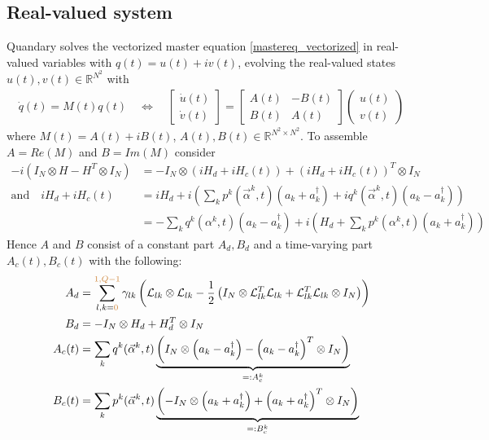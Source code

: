 \documentclass[letterpaper]{article}
\newcommand{\YC}[1]{{\textcolor{Bronze}{#1}}}
\newcommand{\Ell}{\mathcal{L}}
\newcommand{\R}{\mathds{R}}
\begin{document}
  \subsection{Real-valued system}
   Quandary solves the vectorized master equation \eqref{mastereq_vectorized} in
   real-valued variables with $q(t) = u(t) + iv(t)$, evolving the real-valued
   states $u(t), v(t)\in \R^{N^2}$ with
   \begin{align}
     \dot q(t) = M(t) q(t) \quad \Leftrightarrow \quad \begin{bmatrix} \dot u(t) \\ \dot v(t) \end{bmatrix} = 
   \begin{bmatrix} A(t) & -B(t) \\ B(t) & A(t) \end{bmatrix} 
   \begin{pmatrix} u(t) \\ v(t) \end{pmatrix} 
   \label{realvaluedODE}
   \end{align}
   where $M(t) = A(t) + i B(t)$, $A(t), B(t)\in \R^{N^2\times N^2}$. To assemble
   $A = Re(M)$ and $B = Im(M)$ consider
   \begin{align}
     -i(I_N \otimes H - H^T \otimes I_N) &= -I_N \otimes \left(iH_d +
     iH_c(t)\right) + \left(iH_d + iH_c(t)\right)^T \otimes I_N \\
     \text{and} \quad iH_d + iH_c(t) &= i H_d + i\left( \sum_k
     p^k(\vec{\alpha}^k,t)(a_k + a_k^{\dagger}) + iq^k(\vec{\alpha}^k,t)(a_k -
     a_k^{\dagger})\right) \\
                    &= - \sum_k q^k(\alpha^k,t)(a_k - a_k^{\dagger}) + i\left(
                    H_d + \sum_k p^k(\alpha^k,t)(a_k+a_k^{\dagger}) \right) 
   \end{align}
   Hence $A$ and $B$ consist of a constant part $A_d, B_d$ and a time-varying
   part $A_c(t), B_c(t)$ with the following:
   \begin{align}
     A_d &=  \sum_{l,k=\YC{0}}^{\YC{1,Q-1}}\gamma_{lk} \left( \Ell_{lk}\otimes\Ell_{lk} -
     \frac 1 2 \left(I_N \otimes \Ell_{lk}^T\Ell_{lk} +
     \Ell_{lk}^T\Ell_{lk}\otimes I_N\right) \right)\\
     B_d &= -I_N \otimes H_d + H_d^T \otimes I_N \\
     A_c(t) &= \sum_k q^k(\vec{\alpha}^k,t) \underbrace{\left( I_N \otimes
     \left(a_k - a_k^{\dagger}\right) - \left(a_k -
     a_k^{\dagger}\right)^T\otimes I_N \right)}_{=:A_c^k} \\
     B_c(t) &= \sum_k p^k(\vec{\alpha}^k,t) \underbrace{\left( - I_N \otimes
     \left(a_k + a_k^{\dagger}\right) + \left(a_k +
     a_k^{\dagger}\right)^T\otimes I_N \right)}_{=:B_c^k} 
   \end{align}
\end{document}
